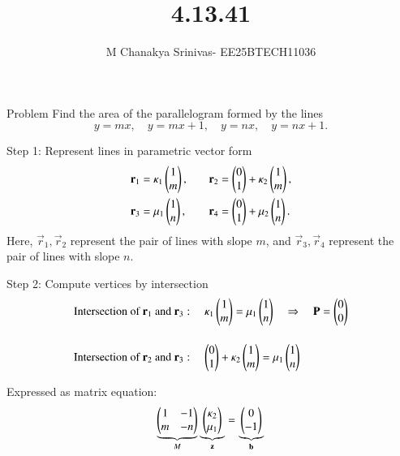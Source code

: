 \documentclass{beamer}
\title %
{4.13.41}
\date{}
\author %
{M Chanakya Srinivas- EE25BTECH11036}
\begin{document}
\frame{\titlepage}


\begin{frame}{Problem}
Find the area of the parallelogram formed by the lines
\[
y = m x, \quad y = m x + 1, \quad y = n x, \quad y = n x + 1.
\]
\end{frame}

\begin{frame}{Step 1: Represent lines in parametric vector form}
\[
\begin{aligned}
\mathbf{r}_1 &= \kappa_1 \begin{pmatrix}1 \\ m\end{pmatrix}, \quad & 
\mathbf{r}_2 &= \begin{pmatrix}0 \\ 1\end{pmatrix} + \kappa_2 \begin{pmatrix}1 \\ m\end{pmatrix}, \\
\mathbf{r}_3 &= \mu_1 \begin{pmatrix}1 \\ n\end{pmatrix}, \quad & 
\mathbf{r}_4 &= \begin{pmatrix}0 \\ 1\end{pmatrix} + \mu_2 \begin{pmatrix}1 \\ n\end{pmatrix}.
\end{aligned}
\]
\pause
Here, \(\vec{r}_1, \vec{r}_2\) represent the pair of lines with slope \(m\), and
\(\vec{r}_3, \vec{r}_4\) represent the pair of lines with slope \(n\).
\end{frame}

\begin{frame}{Step 2: Compute vertices by intersection}
\[
\begin{aligned}
\text{Intersection of } \mathbf{r}_1 \text{ and } \mathbf{r}_3 &: \quad
\kappa_1 \begin{pmatrix}1 \\ m\end{pmatrix} = \mu_1 \begin{pmatrix}1 \\ n\end{pmatrix}
\quad \Rightarrow \quad \mathbf{P} = \begin{pmatrix}0 \\ 0\end{pmatrix}
\\[12pt]
\text{Intersection of } \mathbf{r}_2 \text{ and } \mathbf{r}_3 &: \quad
\begin{pmatrix}0 \\ 1\end{pmatrix} + \kappa_2 \begin{pmatrix}1 \\ m\end{pmatrix} = \mu_1 \begin{pmatrix}1 \\ n\end{pmatrix}
\end{aligned}
\]

Expressed as matrix equation:
\[
\underbrace{\begin{pmatrix}1 & -1 \\ m & -n\end{pmatrix}}_{M}
\underbrace{\begin{pmatrix} \kappa_2 \\ \mu_1 \end{pmatrix}}_{\mathbf{z}} = 
\underbrace{\begin{pmatrix}0 \\ -1\end{pmatrix}}_{\mathbf{b}}
\]
\end{frame}
\end{document}
